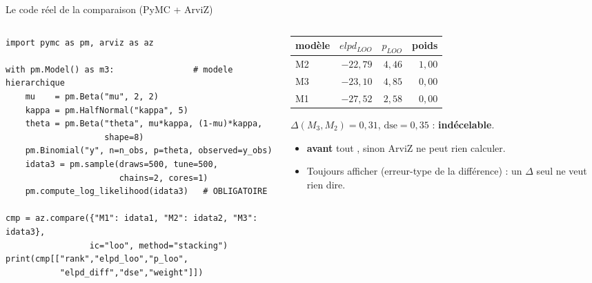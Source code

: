 \begin{frame}[fragile]{Le code réel de la comparaison (PyMC + ArviZ)}
\begin{columns}[t]
\begin{column}{0.56\textwidth}
\begin{codebox}
\begin{lstlisting}[style=py]
import pymc as pm, arviz as az

with pm.Model() as m3:                # modele hierarchique
    mu    = pm.Beta("mu", 2, 2)
    kappa = pm.HalfNormal("kappa", 5)
    theta = pm.Beta("theta", mu*kappa, (1-mu)*kappa,
                    shape=8)
    pm.Binomial("y", n=n_obs, p=theta, observed=y_obs)
    idata3 = pm.sample(draws=500, tune=500,
                       chains=2, cores=1)
    pm.compute_log_likelihood(idata3)   # OBLIGATOIRE

cmp = az.compare({"M1": idata1, "M2": idata2, "M3": idata3},
                 ic="loo", method="stacking")
print(cmp[["rank","elpd_loo","p_loo",
           "elpd_diff","dse","weight"]])
\end{lstlisting}
\end{codebox}
\end{column}
\begin{column}{0.42\textwidth}
\begin{solbox}
\footnotesize
\begin{tabular}{@{}lrrr@{}}
\toprule
modèle & $elpd_{LOO}$ & $p_{LOO}$ & poids \\
\midrule
M2 & $-22{,}79$ & $4{,}46$ & $1{,}00$ \\
M3 & $-23{,}10$ & $4{,}85$ & $0{,}00$ \\
M1 & $-27{,}52$ & $2{,}58$ & $0{,}00$ \\
\bottomrule
\end{tabular}
\vspace{1.5mm}
$\Delta(M_3,M_2) = 0{,}31$, $\text{dse} = 0{,}35$ : \textbf{indécelable}.
\end{solbox}
\begin{kbox}
\begin{itemize}
  \item {} \textbf{avant} tout ,
        sinon ArviZ ne peut rien calculer.
  \item Toujours afficher  (erreur-type de la différence) :
        un $\Delta$ seul ne veut rien dire.
\end{itemize}
\end{kbox}
\end{column}
\end{columns}
\end{frame}

